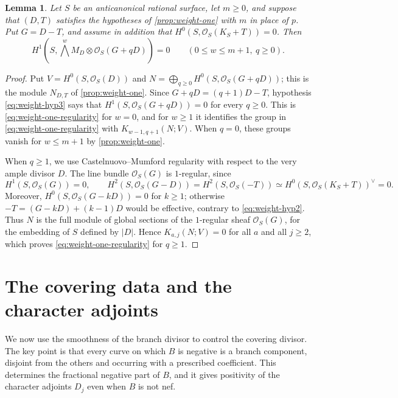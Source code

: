 \documentclass[11pt,reqno]{amsart}
\numberwithin{equation}{section}
\newtheorem{lemma}[lemma]{Lemma}
\theoremstyle{remark}
\newcommand{\sshf}[1]{\mathcal{O}_{#1}}
\begin{document}
\begin{lemma}\label{lem:weight-one-regularity}
Let \(S\) be an anticanonical rational surface, let \(m\geq0\), and suppose that \((D,T)\) satisfies the hypotheses of \cref{prop:weight-one} with \(m\) in place of \(p\). Put \(G=D-T\), and assume in addition that \(H^0(S,\sshf{S}(K_S+T))=0\). Then
\begin{equation}\label{eq:weight-one-regularity}
 H^1\!\left(S,\bigwedge^wM_D\otimes\sshf{S}(G+qD)\right)=0
 \qquad(0\leq w\leq m+1,\ q\geq0).
\end{equation}
\end{lemma}

\begin{proof}
Put \(V=H^0(S,\sshf{S}(D))\) and \(N=\bigoplus_{q\geq0}H^0(S,\sshf{S}(G+qD))\); this is the module \(N_{D,T}\) of \cref{prop:weight-one}. Since \(G+qD=(q+1)D-T\), hypothesis \eqref{eq:weight-hyp3} says that \(H^1(S,\sshf{S}(G+qD))=0\) for every \(q\geq0\). This is \eqref{eq:weight-one-regularity} for \(w=0\), and for \(w\geq1\) it identifies the group in \eqref{eq:weight-one-regularity} with \(K_{w-1,q+1}(N;V)\). When \(q=0\), these groups vanish for \(w\leq m+1\) by \cref{prop:weight-one}.

When \(q\geq1\), we use Castelnuovo--Mumford regularity with respect to the very ample divisor \(D\). The line bundle \(\sshf{S}(G)\) is \(1\)-regular, since
\[
 H^1(S,\sshf{S}(G))=0,\qquad
 H^2(S,\sshf{S}(G-D))=H^2(S,\sshf{S}(-T))\simeq H^0(S,\sshf{S}(K_S+T))^\vee=0.
\]
Moreover, \(H^0(S,\sshf{S}(G-kD))=0\) for \(k\geq1\); otherwise \(-T=(G-kD)+(k-1)D\) would be effective, contrary to \eqref{eq:weight-hyp2}. Thus \(N\) is the full module of global sections of the \(1\)-regular sheaf \(\sshf{S}(G)\), for the embedding of \(S\) defined by \(|D|\). Hence \(K_{a,j}(N;V)=0\) for all \(a\) and all \(j\geq2\), which proves \eqref{eq:weight-one-regularity} for \(q\geq1\).
\end{proof}

\section{The covering data and the character adjoints}\label{sec:branch}

We now use the smoothness of the branch divisor to control
the covering divisor. The key point is that every curve on which \(B\) is negative is a branch component, disjoint from the others and occurring with a prescribed coefficient. This determines the fractional negative part of \(B\), and it gives positivity of the character adjoints \(D_j\) even when
\(B\) is not nef.
\end{document}
